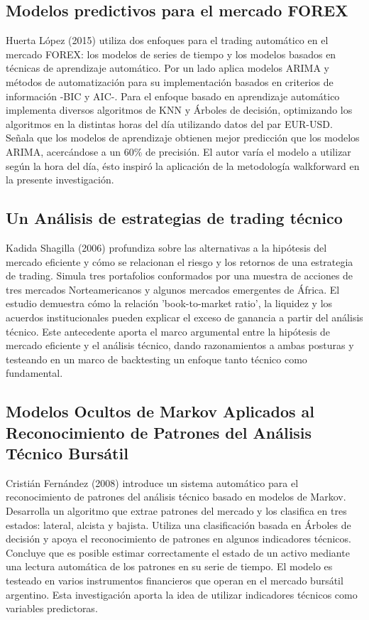 \documentclass[a4paper,12pt]{Latex/Classes/PhDthesisPSnPDF}
\begin{document}
\subsection{Modelos predictivos para el mercado FOREX}

Huerta López (2015) utiliza dos enfoques para el trading automático en el mercado FOREX: los modelos de series de tiempo y los modelos basados en técnicas de aprendizaje automático. Por un lado aplica modelos ARIMA y métodos de automatización para su implementación basados en criterios de información -BIC y AIC-. Para el enfoque basado en aprendizaje automático implementa diversos algoritmos de KNN y Árboles de decisión, optimizando los algoritmos en la distintas horas del día utilizando datos del par EUR-USD. Señala que los modelos de aprendizaje obtienen mejor predicción que los modelos ARIMA, acercándose a un 60\% de precisión. El autor varía el modelo a utilizar según la hora del día, ésto inspiró la aplicación de la metodología walkforward en la presente investigación.

\subsection{Un Análisis de estrategias de trading técnico}

Kadida Shagilla (2006) profundiza sobre las alternativas a la hipótesis del mercado eficiente y cómo se relacionan el riesgo y los retornos de una estrategia de trading. Simula tres portafolios conformados por una muestra de acciones de tres mercados Norteamericanos y algunos mercados emergentes de África. El estudio demuestra cómo la relación 'book-to-market ratio', la liquidez y los acuerdos institucionales pueden explicar el exceso de ganancia a partir del análisis técnico. Este antecedente aporta el marco argumental entre la hipótesis de mercado eficiente y el análisis técnico, dando razonamientos a ambas posturas y testeando en un marco de backtesting un enfoque tanto técnico como fundamental.

\subsection{Modelos Ocultos de Markov Aplicados al Reconocimiento de Patrones del Análisis Técnico Bursátil}

Cristián Fernández (2008) introduce un sistema automático para el reconocimiento de patrones del análisis técnico basado en modelos de Markov. Desarrolla un algoritmo que extrae patrones del mercado y los clasifica en tres estados: lateral, alcista y bajista. Utiliza una clasificación basada en Árboles de decisión y apoya el reconocimiento de patrones en algunos indicadores técnicos. Concluye que es posible estimar correctamente el estado de un activo mediante una lectura automática de los patrones en su serie de tiempo. El modelo es testeado en varios instrumentos financieros que operan en el mercado bursátil argentino. Esta investigación aporta la idea de utilizar indicadores técnicos como variables predictoras.
\end{document}
